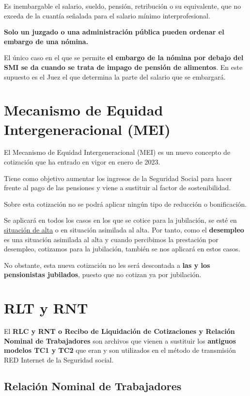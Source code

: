 \documentclass{article}
\begin{document}
	Es inembargable el salario, sueldo, pensión, retribución o su equivalente, que no exceda de la cuantía señalada para el salario mínimo interprofesional.
	
	\textbf{Solo un juzgado o una administración pública pueden ordenar el embargo de una nómina.}
	
	El único caso en el que se permite \textbf{el embargo de la nómina por debajo del SMI se da cuando se trata de impago de pensión de alimentos}. En este supuesto es el Juez el que determina la parte del salario que se embargará.
	
	\section*{Mecanismo de Equidad Intergeneracional (MEI)}
	
	El Mecanismo de Equidad Intergeneracional (MEI) es un nuevo concepto de cotización que ha entrado en vigor en enero de 2023.
	
	Tiene como objetivo aumentar los ingresos de la Seguridad Social para hacer frente al pago de las pensiones y viene a sustituir al factor de sostenibilidad.
	
	Sobre esta cotización no se podrá aplicar ningún tipo de reducción o bonificación.
	
	Se aplicará en todos los casos en los que se cotice para la jubilación, se esté en \underline{situación de alta} o en situación asimilada al alta. Por tanto, como el \textbf{desempleo} es una situación asimilada al alta y cuando percibimos la prestación por desempleo, cotizamos para la jubilación, también se nos aplicará en estos casos.
	
	No obstante, esta nueva cotización no les será descontada a \textbf{las y los pensionistas jubilados}, puesto que no cotizan ya por jubilación.
	
	\section*{RLT y RNT}
	
	El \textbf{RLC y RNT o Recibo de Liquidación de Cotizaciones y Relación Nominal de Trabajadores} son archivos que vienen a sustituir los \textbf{antiguos modelos TC1 y TC2} que eran y son utilizados en el método de transmisión RED Internet de la Seguridad social.
	
	\subsection*{Relación Nominal de Trabajadores}
	
\end{document}

